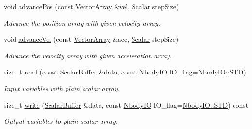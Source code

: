\begin{DoxyCompactItemize}
void \mbox{\hyperlink{class_space_h_1_1_vel_indep_particles_a75d5a3918dd3ceb323796c425baa3710}{advance\+Pos}} (const \mbox{\hyperlink{class_space_h_1_1_vel_indep_particles_aa9983058940249df8b00fa800e8cbad2}{Vector\+Array}} \&\mbox{\hyperlink{class_space_h_1_1_vel_indep_particles_a3c096b30a541cd468d6fe5f9d138b3e5}{vel}}, \mbox{\hyperlink{class_space_h_1_1_vel_indep_particles_aeb47d8131b30ed790320ff634f0d6af1}{Scalar}} step\+Size)
\begin{DoxyCompactList}\small\item\em Advance the position array with given velocity array. \end{DoxyCompactList}\item 
void \mbox{\hyperlink{class_space_h_1_1_vel_indep_particles_ac9344beddefc9182032c4966b70ff0c7}{advance\+Vel}} (const \mbox{\hyperlink{class_space_h_1_1_vel_indep_particles_aa9983058940249df8b00fa800e8cbad2}{Vector\+Array}} \&acc, \mbox{\hyperlink{class_space_h_1_1_vel_indep_particles_aeb47d8131b30ed790320ff634f0d6af1}{Scalar}} step\+Size)
\begin{DoxyCompactList}\small\item\em Advance the velocity array with given acceleration array. \end{DoxyCompactList}\item 
size\+\_\+t \mbox{\hyperlink{class_space_h_1_1_vel_indep_particles_a46af27fe0ad3ef6789ead80cbe9cf1e9}{read}} (const \mbox{\hyperlink{class_space_h_1_1_vel_indep_particles_abca40159a816385790d5a6fd19c1dc6d}{Scalar\+Buffer}} \&data, const \mbox{\hyperlink{namespace_space_h_a296a8bae763a754564bfdce216e31b59}{Nbody\+IO}} I\+O\+\_\+flag=\mbox{\hyperlink{namespace_space_h_a296a8bae763a754564bfdce216e31b59ac6ce23be5d350ce18a665427d2d950f7}{Nbody\+I\+O\+::\+S\+TD}})
\begin{DoxyCompactList}\small\item\em Input variables with plain scalar array. \end{DoxyCompactList}\item 
size\+\_\+t \mbox{\hyperlink{class_space_h_1_1_vel_indep_particles_a29f0ab3b29eeabc746117ec2a759d8b1}{write}} (\mbox{\hyperlink{class_space_h_1_1_vel_indep_particles_abca40159a816385790d5a6fd19c1dc6d}{Scalar\+Buffer}} \&data, const \mbox{\hyperlink{namespace_space_h_a296a8bae763a754564bfdce216e31b59}{Nbody\+IO}} I\+O\+\_\+flag=\mbox{\hyperlink{namespace_space_h_a296a8bae763a754564bfdce216e31b59ac6ce23be5d350ce18a665427d2d950f7}{Nbody\+I\+O\+::\+S\+TD}}) const
\begin{DoxyCompactList}\small\item\em Output variables to plain scalar array. \end{DoxyCompactList}\end{DoxyCompactItemize}
